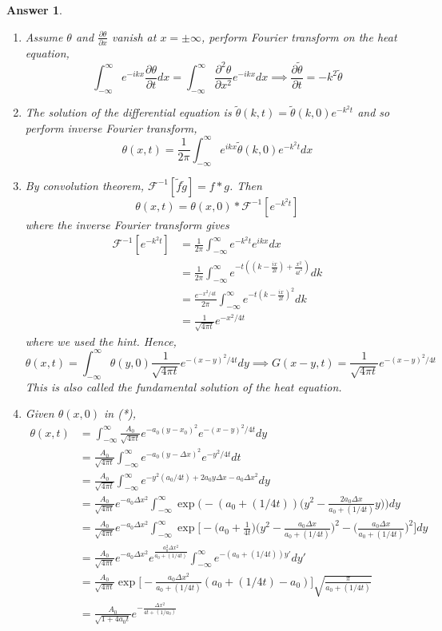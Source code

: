 \documentclass[a4paper]{article}
\newtheorem{ans}{Answer}[section]
\theoremstyle{new}
\begin{document}
\begin{ans}\leavevmode
\begin{enumerate}[label=(\roman*)]
\item Assume $\theta$ and $\frac{\partial\theta}{\partial x}$ vanish at $x=\pm\infty$, perform Fourier transform on the heat equation,
$$\int_{-\infty}^\infty e^{-ikx}\frac{\partial\theta}{\partial t}dx=\int_{-\infty}
^\infty\frac{\partial^2\theta}{\partial x^2}e^{-ikx}dx\implies\frac{\partial\tilde{\theta}}{\partial t}=-k^2\tilde{\theta}$$
\item The solution of the differential equation is $\tilde{\theta}(k,t)=\tilde{\theta}(k,0)e^{-k^2t}$ and so perform inverse Fourier transform,
$$\theta(x,t)=\frac{1}{2\pi}\int_{-\infty}^\infty e^{ikx}\tilde{\theta}(k,0)e^{-k^2t}dx$$
\item By convolution theorem, $\mathcal{F}^{-1}[\tilde{f}\tilde{g}]=f*g$. Then
$$\theta(x,t)=\theta(x,0)*\mathcal{F}^{-1}[e^{-k^2t}]$$
where the inverse Fourier transform gives
\begin{align}
    \mathcal{F}^{-1}[e^{-k^2t}]&=\frac{1}{2\pi}\int_{-\infty}^\infty e^{-k^2t}e^{ikx}dx\nonumber\\&=\frac{1}{2\pi}\int_{-\infty}^\infty e^{-t((k-\frac{ix}{2t})+\frac{x^2}{4t^2})}dk\nonumber\\&=\frac{e^{-x^2/4t}}{2\pi}\int_{-\infty}
^\infty e^{-t(k-\frac{ix}{2t})^2}dk\nonumber\\&=\frac{1}{\sqrt{4\pi t}}e^{-x^2/4t}\nonumber
\end{align}
where we used the hint. Hence,
$$\theta(x,t)=\int_{-\infty}^\infty\theta(y,0)\frac{1}{\sqrt{4\pi t}}e^{-(x-y)^2/4t}dy\implies G(x-y,t)=\frac{1}{\sqrt{4\pi t}}e^{-(x-y)^2/4t}$$
This is also called the fundamental solution of the heat equation.
\item Given $\theta(x,0)$ in (*),
\begin{align}
\theta(x,t)&=\int_{-\infty}^\infty\frac{A_0}{\sqrt{4\pi t}}e^{-a_0(y-x_0)^2}e^{-(x-y)^2/4t}dy\nonumber\\&=\frac{A_0}{\sqrt{4\pi t}}\int_{-\infty}
^\infty e^{-a_0(y-\Delta x)^2}e^{-y^2/4t}dt\nonumber\\&=\frac{A_0}{\sqrt{4\pi t}}\int_{-\infty}^\infty e^{-y^2(a_0/4t)+2a_0y\Delta x-a_0\Delta x^2}dy\nonumber\\&=\frac{A_0}{\sqrt{4\pi t}}e^{-a_0\Delta x^2}\int_{-\infty}^\infty \exp\bigg(-(a_0+(1/4t))\bigg(y^2-\frac{2a_0\Delta x}{a_0+(1/4t)}y\bigg)\bigg)dy\nonumber\\&=\frac{A_0}{\sqrt{4\pi t}}e^{-a_0\Delta x^2}\int_{-\infty}^\infty\exp\bigg[-\bigg(a_0+\frac{1}{4t}\bigg)\bigg(y^2-\frac{a_0\Delta x}{a_0+(1/4t)}\bigg)^2-\bigg(\frac{a_0\Delta x}{a_0+(1/4t)}\bigg)^2\bigg]dy\nonumber\\&=\frac{A_0}{\sqrt{4\pi t}}e^{-a_0\Delta x^2}e^{\frac{a_0^2\Delta x^2}{a_0+(1/4t)}}\int_{-\infty}^\infty e^{-(a_0+(1/4t))y'}dy'\nonumber\\&=\frac{A_0}{\sqrt{4\pi t}}\exp\bigg[-\frac{a_0\Delta x^2}{a_0+(1/4t)}(a_0+(1/4t)-a_0)\bigg]\sqrt{\frac{\pi}{a_0+(1/4t)}}\nonumber\\&=\frac{A_0}{\sqrt{1+4a_0t}}e^{-\frac{\Delta x^2}{4t+(1/a_0)}}\nonumber

\end{align}
\end{enumerate}
\end{ans}
\end{document}
